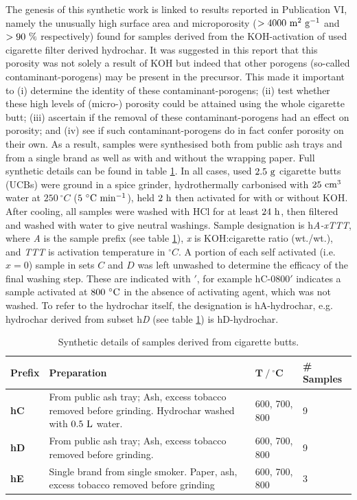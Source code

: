 The genesis of this synthetic work is linked to results reported in Publication VI, namely the unusually high surface area and microporosity ($ \rm > 4000\ m^2\ g^{-1}$ and $\rm > 90\ \%$ respectively) found for samples derived from the KOH-activation of used cigarette filter derived hydrochar. It was suggested in this report that this porosity was not solely a result of KOH but indeed that other porogens (so-called contaminant-porogens) may be present in the precursor. This made it important to (i) determine the identity of these  contaminant-porogens; (ii) test whether these high levels of (micro-) porosity could be attained using the whole cigarette butt; (iii) ascertain if the removal of these contaminant-porogens had an effect on porosity; and (iv) see if such contaminant-porogens do in fact confer porosity on their own. As a result, samples were synthesised both from public ash trays and from a single brand as well as with and without the wrapping paper. Full synthetic details can be found in table \ref{tb:cb_synthesis}. In all cases, used $\rm 2.5\ g$ cigarette butts (UCBs) were ground in a spice grinder, hydrothermally carbonised with $\rm 25\ cm^3$ water at $250\ ^{\circ}C$ ($\rm 5\ ^{\circ}C\ min^{-1}$), held $\rm 2\ h$ then activated for with or without KOH. After cooling, all samples were washed with HCl for at least $\rm 24\ h$, then filtered and washed with water to give neutral washings. Sample designation is h\textit{A-xTTT}, where \textit{A} is the sample prefix (see table \ref{tb:cb_synthesis}), \textit{x} is KOH:cigarette ratio (wt./wt.), and \textit{TTT} is activation temperature in $^{\circ}C$. A portion of each self activated (i.e. $x = 0$) sample in sets $C$ and $D$ was left unwashed to determine the efficacy of the final washing step. These are indicated with $'$, for example hC-0800$'$ indicates a sample activated at $\rm 800\ ^{\circ}C$ in the absence of activating agent, which was not washed. To refer to the hydrochar itself, the designation is hA-hydrochar, e.g. hydrochar derived from subset h\textit{D} (see table \ref{tb:cb_synthesis}) is hD-hydrochar.

\begin{table}[t]
\caption{Synthetic details of samples derived from cigarette butts.}
\label{tb:cb_synthesis}
\begin{tabularx}{\textwidth}{lXll}
\toprule
\textbf{Prefix} & \textbf{Preparation} & $\mathbf{T\ /\ ^{\circ}C}$ & \textbf{\# Samples} \\ 
\midrule
\textbf{hC}     & From public ash tray; Ash, excess tobacco removed before grinding. Hydrochar washed with $\rm 0.5\ L$ water.              & 600, 700, 800 & 9              \\
\textbf{hD}     &  From public ash tray; Ash, excess tobacco removed before grinding.             & 600, 700, 800 & 9             \\
\textbf{hE}     & Single brand from single smoker. Paper, ash, excess tobacco removed before grinding              & 600, 700, 800 & 3              \\
\bottomrule
\end{tabularx}%
\end{table}

